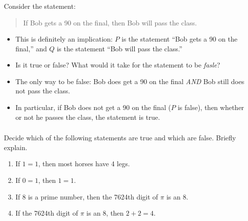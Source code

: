\documentclass[11pt, compress]{beamer}
\begin{document}
\begin{frame}
\frametitle{}
\begin{example}[0.2.2]Consider the statement:
\begin{quote}%
If Bob gets a 90 on the final, then Bob will pass the class.
\end{quote}

\pause 

\begin{itemize}[<+->]
\item{} This is definitely an implication: \(P\) is the statement ``Bob gets a 90 on the final,'' and \(Q\) is the statement ``Bob will pass the class.''


\item{} Is it true or false?  What would it take for the statement to be \emph{fasle}?


\item{} The only way to be false: Bob does get a 90 on the final \emph{AND} Bob still does not pass the class.


\item{} In particular, if Bob does not get a 90 on the final (\(P\) is false), then whether or not he passes the class, the statement is true.

\end{itemize}

\end{example}
\end{frame}
 
\begin{frame}
\frametitle{}
\begin{example}[0.2.3]Decide which of the following statements are true and which are false. Briefly explain.\begin{enumerate}
\item{} If \(1=1\), then most horses have 4 legs.


\item{} If \(0=1\), then \(1=1\).


\item{} If 8 is a prime number, then the 7624th digit of \(\pi\) is an 8.


\item{} If the 7624th digit of \(\pi\) is an 8, then \(2+2 = 4\).

\end{enumerate}

\end{example}
\end{frame}
 
\end{document}
